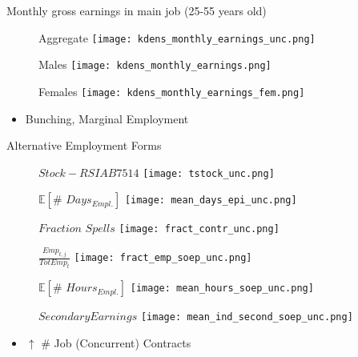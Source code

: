 \documentclass{beamer}
\begin{document}
\begin{frame}{Monthly gross earnings in main job (25-55 years old)}
\begin{figure}[!t]
\centering
\begin{minipage}[b]{0.32\textwidth}{Aggregate}
\centering
\texttt{[image: kdens\_monthly\_earnings\_unc.png]}
\end{minipage}
\begin{minipage}[b]{0.32\textwidth}{Males}
\centering
\texttt{[image: kdens\_monthly\_earnings.png]}
\end{minipage}
\begin{minipage}[b]{0.32\textwidth}{Females}
\centering
\texttt{[image: kdens\_monthly\_earnings\_fem.png]}
\end{minipage}
\end{figure}
\begin{itemize}
\setlength{\itemsep}{0.7 cm}
\item Bunching, Marginal Employment
\end{itemize}
\end{frame}

\begin{frame}{Alternative Employment Forms}
\begin{figure}[!t]
\centering
\begin{minipage}[b]{0.3\textwidth}{$Stock - RSIAB7514$}
\centering
\texttt{[image: tstock\_unc.png]}
\end{minipage}
\begin{minipage}[b]{0.3\textwidth}{$\mathbb{E}[\# \,\, Days_{Empl.}]$}
\centering
\texttt{[image: mean\_days\_epi\_unc.png]}
\end{minipage}
\begin{minipage}[b]{0.3\textwidth}{$Fraction \,\, Spells$}
\centering
\texttt{[image: fract\_contr\_unc.png]}
\end{minipage}
\end{figure}
\begin{figure}[!t]
\centering
\begin{minipage}[b]{0.3\textwidth}{$\frac{Emp_{t,j}}{TotEmp_{t}}$}
\centering
\texttt{[image: fract\_emp\_soep\_unc.png]}
\end{minipage}
\begin{minipage}[b]{0.3\textwidth}{$\mathbb{E}[\# \,\, Hours_{Empl.}]$}
\centering
\texttt{[image: mean\_hours\_soep\_unc.png]}
\end{minipage}
\begin{minipage}[b]{0.3\textwidth}{$Secondary Earnings$}
\centering
\texttt{[image: mean\_ind\_second\_soep\_unc.png]}
\end{minipage}
\end{figure}
\begin{itemize}
\setlength{\itemsep}{0.7 cm}
\item $\uparrow$ \# Job (Concurrent) Contracts
\end{itemize}
\end{frame}
\end{document}
